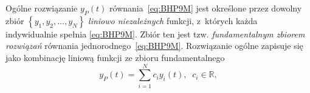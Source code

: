 \documentclass[paper=a4,DIV=12]{lpas}
\newcommand{\od}[2]{\frac{\mathrm{d}#1}{\mathrm{d}#2}}
\newcommand{\odn}[3]{\frac{\mathrm{d}^{#1}#2}{\mathrm{d}{#3}^{#1}}}
\begin{document}


Ogólne rozwiązanie $y_P(t)$ równania~\eqref{eq:BHP9M} jest określone przez
dowolny zbiór $\left\lbrace y_1, y_2, \dots, y_N \right\rbrace$ {\em liniowo
niezależnych} funkcji, z~których każda indywidualnie spełnia
\eqref{eq:BHP9M}. Zbiór ten jest tzw. {\em fundamentalnym zbiorem rozwiązań}
równania jednorodnego~\eqref{eq:BHP9M}. Rozwiązanie ogólne zapisuje się jako
kombinację liniową funkcji ze zbioru fundamentalnego
\begin{equation}
  y_P(t) = \sum_{i = 1}^{N} c_i y_i(t),
  \;\; c_i \in \mathbb{R},
  \label{eq:M9LBE}
\end{equation}
\end{document}
